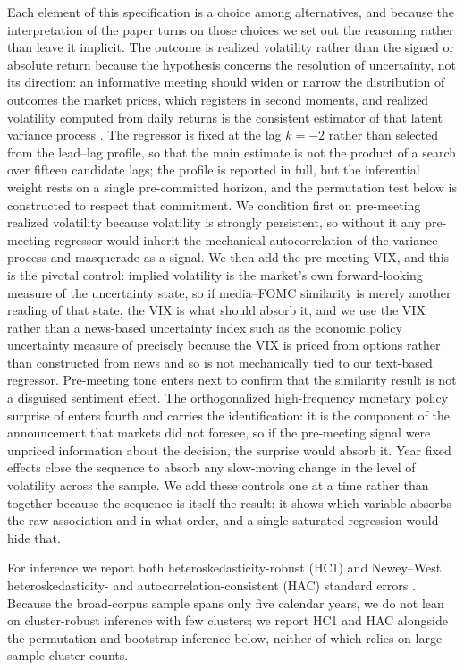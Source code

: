 \documentclass[11pt,a4paper]{article}
\begin{document}
Each element of this specification is a choice among alternatives, and because the
interpretation of the paper turns on those choices we set out the reasoning rather
than leave it implicit. The outcome is realized volatility rather than the signed
or absolute return because the hypothesis concerns the resolution of uncertainty,
not its direction: an informative meeting should widen or narrow the distribution
of outcomes the market prices, which registers in second moments, and realized
volatility computed from daily returns is the consistent estimator of that latent
variance process \citep{andersen2003modeling}. The regressor is fixed at the lag
$k=-2$ rather than selected from the lead--lag profile, so that the main estimate is
not the product of a search over fifteen candidate lags; the profile is reported in
full, but the inferential weight rests on a single pre-committed horizon, and the
permutation test below is constructed to respect that commitment. We condition
first on pre-meeting realized volatility because volatility is strongly persistent,
so without it any pre-meeting regressor would inherit the mechanical autocorrelation
of the variance process and masquerade as a signal. We then add the pre-meeting
VIX, and this is the pivotal control: implied volatility is the market's own
forward-looking measure of the uncertainty state, so if media--FOMC similarity is
merely another reading of that state, the VIX is what should absorb it, and we use
the VIX rather than a news-based uncertainty index such as the economic policy
uncertainty measure of \citet{baker2016measuring} precisely because the VIX is
priced from options rather than constructed from news and so is not mechanically
tied to our text-based regressor. Pre-meeting tone enters next to confirm that the
similarity result is not a disguised sentiment effect. The orthogonalized
high-frequency monetary policy surprise of \citet{bauer2023reassessment} enters
fourth and carries the identification: it is the component of the announcement that
markets did not foresee, so if the pre-meeting signal were unpriced information
about the decision, the surprise would absorb it. Year fixed effects close the
sequence to absorb any slow-moving change in the level of volatility across the
sample. We add these controls one at a time rather than together because the
sequence is itself the result: it shows which variable absorbs the raw association
and in what order, and a single saturated regression would hide that.

For inference we report both heteroskedasticity-robust (HC1) and Newey--West
heteroskedasticity- and autocorrelation-consistent (HAC) standard errors
\citep{newey1987simple}. Because the broad-corpus sample spans only five calendar
years, we do not lean on cluster-robust inference with few clusters; we report HC1
and HAC alongside the permutation and bootstrap inference below, neither of which
relies on large-sample cluster counts.
\end{document}

